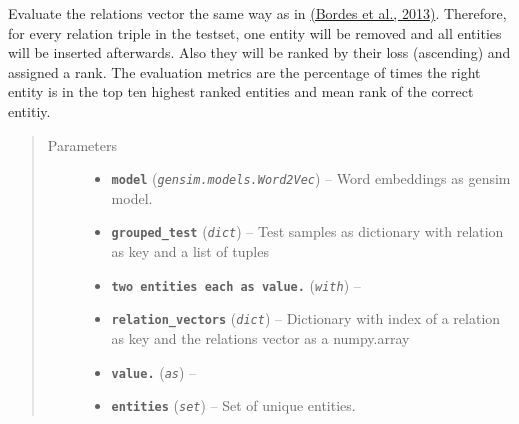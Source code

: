 \documentclass[letterpaper,10pt,english]{sphinxmanual}
\begin{document}
\begin{fulllineitems}
\label{src.trans_e:src.trans_e.trans_we.evaluate}
Evaluate the relations vector the same way as in \href{http://papers.nips.cc/paper/5071-translating-embeddings-for-modeling-multi-relational-data.pdf}{(Bordes et al.,
2013)}.
Therefore, for every relation triple in the testset, one entity will be removed and all entities will be inserted
afterwards. Also they will be ranked by their loss (ascending) and assigned a rank. The evaluation metrics are
the percentage of times the right entity is in the top ten highest ranked entities and mean rank of the correct
entitiy.
\begin{quote}\begin{description}
\item[{Parameters}] \leavevmode\begin{itemize}
\item {} 
\textbf{\texttt{model}} (\emph{\texttt{gensim.models.Word2Vec}}) -- Word embeddings as gensim model.

\item {} 
\textbf{\texttt{grouped\_test}} (\emph{\texttt{dict}}) -- Test samples as dictionary with relation as key and a list of tuples

\item {} 
\textbf{\texttt{two entities each as value.}} (\emph{\texttt{with}}) -- 

\item {} 
\textbf{\texttt{relation\_vectors}} (\emph{\texttt{dict}}) -- Dictionary with index of a relation as key and the relations vector as a numpy.array

\item {} 
\textbf{\texttt{value.}} (\emph{\texttt{as}}) -- 

\item {} 
\textbf{\texttt{entities}} (\emph{\texttt{set}}) -- Set of unique entities.

\end{itemize}

\end{description}\end{quote}

\end{fulllineitems}

\end{document}
